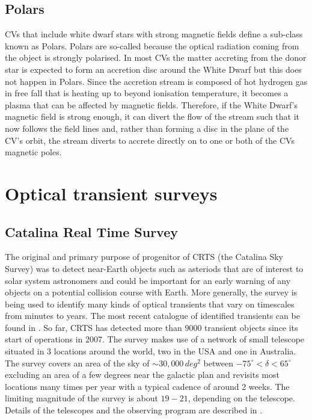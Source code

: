 \documentclass[a4paper,fleqn,usenatbib]{mnras}
\begin{document}
\subsection{Polars}
CVs that include white dwarf stars with strong magnetic fields define a sub-class known as Polars. Polars are so-called because the optical radiation coming from the object is strongly polarised. In most CVs the matter accreting from the donor star is expected to form an accretion disc around the White Dwarf but this does not happen in Polars. Since the accretion stream is composed of hot hydrogen gas in free fall that is heating up to beyond ionisation temperature, it becomes a plasma that can be affected by magnetic fields. Therefore, if the White Dwarf's magnetic field is strong enough, it can divert the flow of the stream such that it now follows the field lines and, rather than forming a disc in the plane of the CV's orbit, the stream diverts to accrete directly on to one or both of the CVs magnetic poles. 

\section{Optical transient surveys}

\subsection{Catalina Real Time Survey}
The original and primary purpose of progenitor of CRTS (the Catalina Sky Survey) was to detect near-Earth objects such as asteriods that are of interest to solar system astronomers and could be important for an early warning of any objects on a potential collision course with Earth. More generally, the survey is being used to identify many kinds of optical transients that vary on timescales from minutes to years. The most recent catalogue of identified transients can be found in \citet{CatalinaCatalog}. So far, CRTS has detected more than 9000 transient objects since its start of operations in 2007. The survey makes use of a network of  small telescope situated in 3 locations around the world, two in the USA and one in Australia. The survey covers an area of the sky of $\sim 30,000\,deg^2$ between $-75^\circ < \delta < 65^\circ$ excluding an area of a few degrees near the galactic plan and revisits most locations many times per year with a typical cadence of around 2 weeks. The limiting magnitude of the survey is about $19-21$, depending on the telescope. Details of the telescopes and the observing program are described in \citet{Drake2009}. 
\end{document}
